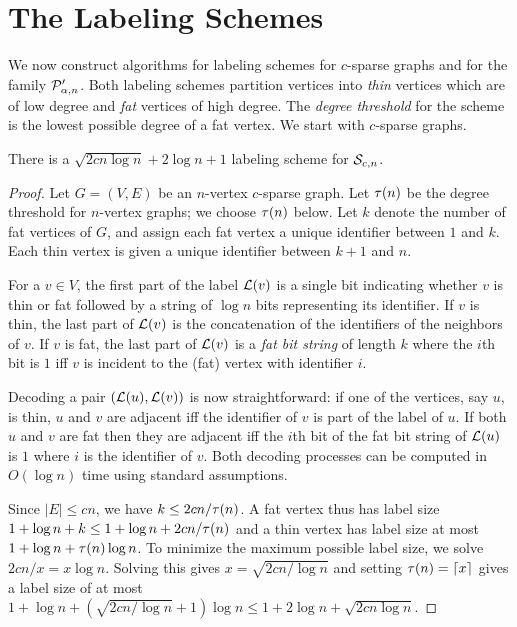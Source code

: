 
\section{The Labeling Schemes}
\label{sec:lab_schem}
We now construct algorithms for labeling schemes for $c$-sparse graphs and for the family $ \mathcal{P}'_{\alpha,n}$. Both labeling schemes partition vertices into \emph{thin} vertices which are of low degree and \emph{fat} vertices of high degree. The \emph{degree threshold} for the scheme is the lowest possible degree of a fat vertex. We start with $c$-sparse graphs.
\begin{theorem}\label{sparse-label}
There is a $\sqrt{2cn\log n} + 2\log n + 1$ labeling scheme for $ \mathcal{S}_{c,n}$.
\end{theorem}
\begin{proof}
Let $G=(V,E)$ be an $n$-vertex $c$-sparse graph. Let $\tau(n)$ be the degree threshold for $n$-vertex graphs; we choose $\tau(n)$ below. Let $k$ denote the number of fat vertices of $G$, and assign each fat vertex a unique identifier between $1$ and $k$. Each thin vertex is given a unique identifier between $k+1$ and $n$.

For a $v\in V$, the first part of the label $ \mathcal{L}(v)$ is a single bit indicating whether $v$ is thin or fat followed by a string of $\log n$ bits representing its identifier. If $v$ is thin, the last part of $ \mathcal{L}(v)$ is the concatenation of the identifiers of the neighbors of $v$. If $v$ is fat, the last part of $ \mathcal{L}(v)$ is a \emph{fat bit string} of length $k$ where the $i$th bit is $1$ iff $v$ is incident to the (fat) vertex with identifier $i$.

Decoding a pair $( \mathcal{L}(u), \mathcal{L}(v))$ is now straightforward: if one of the vertices, say $u$, is thin, $u$ and $v$ are adjacent iff the identifier of $v$ is part of the label of $u$. If both $u$ and $v$ are fat then they are adjacent iff the $i$th bit of the fat bit string of $ \mathcal{L}(u)$ is $1$ where $i$ is the identifier of $v$.
Both decoding processes can be computed in $O(\log n)$ time using standard assumptions.

Since $|E|\leq cn$, we have $k\leq 2cn/\tau(n)$. A fat vertex thus has label size $1 + \log n + k\leq 1 + \log n + 2cn/\tau(n)$ and a thin vertex has label size at most $1 + \log n + \tau(n)\log n$. To minimize the maximum possible label size, we solve $2cn/x = x\log n$. Solving this gives $x = \sqrt{2cn/\log n}$ and setting $\tau(n) = \lceil x\rceil$ gives a label size of at most $1 + \log n + (\sqrt{2cn/\log n} + 1)\log n\leq 1 + 2\log n + \sqrt{2cn\log n}$.
\end{proof}

